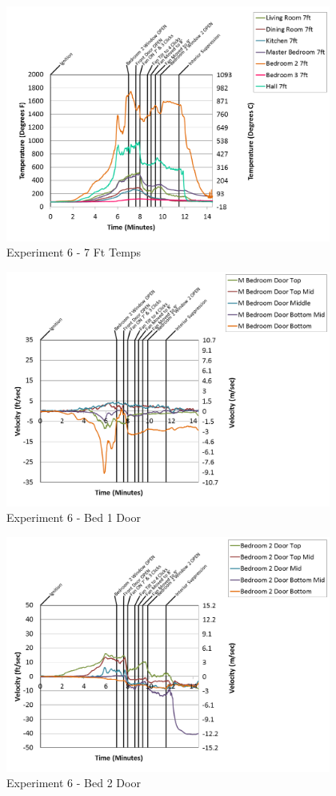 \documentclass{article}
\begin{document}
\begin{appendices}
\begin{figure}[h!]
	\centering
	\includegraphics[height=3.05in]{0_Images/Results_Charts/Exp_6_Charts/7FtTemps.png}
	\caption{Experiment 6 - 7 Ft Temps}
\end{figure}

\clearpage

\begin{figure}[h!]
	\centering
	\includegraphics[height=3.05in]{0_Images/Results_Charts/Exp_6_Charts/Bed1Door.png}
	\caption{Experiment 6 - Bed 1 Door}
\end{figure}


\begin{figure}[h!]
	\centering
	\includegraphics[height=3.05in]{0_Images/Results_Charts/Exp_6_Charts/Bed2Door.png}
	\caption{Experiment 6 - Bed 2 Door}
\end{figure}


\end{appendices}
\end{document}
